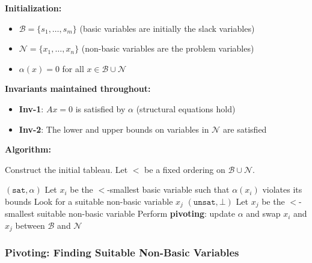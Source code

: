 \documentclass[11pt,a4paper]{article}
\theoremstyle{definition}
\theoremstyle{plain}
\theoremstyle{remark}
\begin{document}
\begin{tcolorbox}[colback=orange!5!white,colframe=orange!75!black,title=\textbf{General Simplex Algorithm}]

\textbf{Initialization:}
\begin{itemize}
    \item $\mathcal{B} = \{s_1, \ldots, s_m\}$ (basic variables are initially the slack variables)
    \item $\mathcal{N} = \{x_1, \ldots, x_n\}$ (non-basic variables are the problem variables)
    \item $\alpha(x) = 0$ for all $x \in \mathcal{B} \cup \mathcal{N}$
\end{itemize}

\vspace{0.5em}

\textbf{Invariants maintained throughout:}
\begin{itemize}
    \item \textbf{Inv-1}: $Ax = 0$ is satisfied by $\alpha$ (structural equations hold)
    \item \textbf{Inv-2}: The lower and upper bounds on variables in $\mathcal{N}$ are satisfied
\end{itemize}

\vspace{0.5em}

\textbf{Algorithm:}

Construct the initial tableau. Let $<$ be a fixed ordering on $\mathcal{B} \cup \mathcal{N}$.

\begin{algorithmic}[1]
        \RETURN $(\texttt{sat}, \alpha)$
    \ENDIF
    \STATE Let $x_i$ be the $<$-smallest basic variable such that $\alpha(x_i)$ violates its bounds
    \STATE Look for a suitable non-basic variable $x_j$
        \RETURN $(\texttt{unsat}, \bot)$
    \ELSE
        \STATE Let $x_j$ be the $<$-smallest suitable non-basic variable
        \STATE Perform \textbf{pivoting}: update $\alpha$ and swap $x_i$ and $x_j$ between $\mathcal{B}$ and $\mathcal{N}$
    \ENDIF
\ENDWHILE
\end{algorithmic}
\end{tcolorbox}

\subsubsection{Pivoting: Finding Suitable Non-Basic Variables}
\end{document}
